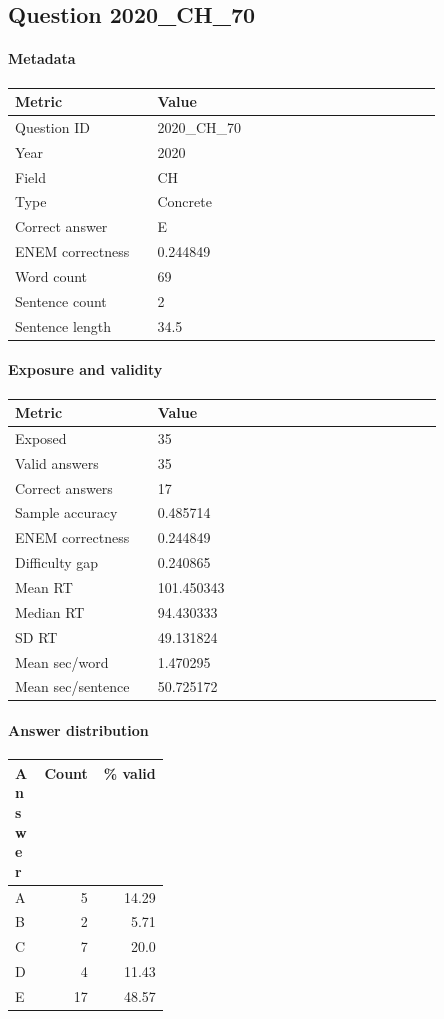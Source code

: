 \subsection*{Question 2020\_CH\_70}
\label{sec:q_2020_CH_70}
\paragraph{Metadata}
\begin{tabular}{p{0.30\linewidth}p{0.60\linewidth}}
\toprule
Metric & Value\\
\midrule
Question ID & 2020\_CH\_70\\
Year & 2020\\
Field & CH\\
Type & Concrete\\
Correct answer & E\\
ENEM correctness & 0.244849\\
Word count & 69\\
Sentence count & 2\\
Sentence length & 34.5\\
\bottomrule
\end{tabular}

\paragraph{Exposure and validity}
\begin{tabular}{p{0.30\linewidth}p{0.60\linewidth}}
\toprule
Metric & Value\\
\midrule
Exposed & 35\\
Valid answers & 35\\
Correct answers & 17\\
Sample accuracy & 0.485714\\
ENEM correctness & 0.244849\\
Difficulty gap & 0.240865\\
Mean RT & 101.450343\\
Median RT & 94.430333\\
SD RT & 49.131824\\
Mean sec/word & 1.470295\\
Mean sec/sentence & 50.725172\\
\bottomrule
\end{tabular}

\paragraph{Answer distribution}
\begin{tabular}{p{0.18\linewidth}rr}
\toprule
Answer & Count & \% valid\\
\midrule
A & 5 & 14.29\\
B & 2 & 5.71\\
C & 7 & 20.0\\
D & 4 & 11.43\\
E & 17 & 48.57\\
\bottomrule
\end{tabular}

